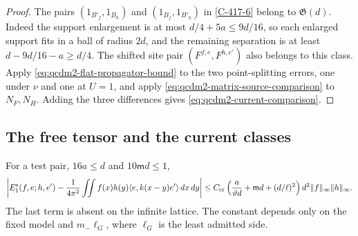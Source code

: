 \documentclass[11pt,letterpaper,reqno]{amsart}
\makeatletter
\theoremstyle{definition}
\newcommand{\ms@minorstart}{%
  \pushQED{\qed}\renewcommand{\qedsymbol}{$\blacksquare$}}
\newenvironment{lemma}[1][]{\ms@minorstart\ms@lemma[#1]}
  {\popQED\endms@lemma}
\theoremstyle{remark}
\makeatother
\begin{document}
\begin{proof}
The pairs $(1_{B'_f},1_{B_h})$ and
$(1_{B_f},1_{B'_h})$ in \cref{C-417-6} belong to
$\mathfrak G(d)$.  Indeed the support enlargement is
at most $d/4+5a\le9d/16$, so each enlarged support
fits in a ball of radius $2d$, and the remaining
separation is at least $d-9d/16-a\ge d/4$.
The shifted site pair $(F^{f,e},F^{h,e'})$ also belongs
to this class.  Apply \eqref{eq:qcdm2-flat-propagator-bound}
to the two point-splitting errors, one under $\nu$ and
one at $U=1$, and apply
\eqref{eq:qcdm2-matrix-source-comparison} to $N_F,N_H$.
Adding the three differences gives
\eqref{eq:qcdm2-current-comparison}.
\end{proof}

\subsection{The free tensor and the current classes}

\begin{lemma}\label{C-417-13}
For a test pair, $16a\le d$ and $10\mathsf m d\le1$,
\begin{align}
 \left|E_1^{\rm s}(f,e;h,e')
       -\frac1{4\pi^2}\iint
          f(x)h(y)\langle e,k(x-y)e'\rangle\,dx\,dy\right|
 \le C_{\rm cr}\left(\frac a{\vartheta d}
                +\mathsf m d+(d/\ell)^2\right)
                                      d^2\|f\|_\infty\|h\|_\infty.
 \label{eq:qcdm2-free-current}
\end{align}
The last term is absent on the infinite lattice.
The constant depends only on the fixed model and
${m_-}\ell_G$, where $\ell_G$ is the least admitted side.
\end{lemma}
\end{document}
